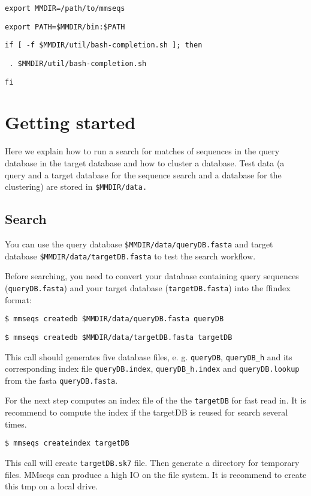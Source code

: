 \documentclass[11pt,a4paper]{report}
\begin{document}
\texttt{export MMDIR=/path/to/mmseqs}

\texttt{export PATH=\$MMDIR/bin:\$PATH}

\texttt{if [ -f \$MMDIR/util/bash-completion.sh ]; then}

\texttt{	. \$MMDIR/util/bash-completion.sh}

\texttt{fi}

\section{Getting started}

Here we explain how to run a search for matches of sequences in the
query database in the target database and how to cluster a database.
Test data (a query and a target database for the sequence search and
a database for the clustering) are stored in \texttt{\$MMDIR/data.}


\subsection*{Search}

You can use the query database \texttt{\$MMDIR/data/queryDB.fasta} and target database
\texttt{\$MMDIR/data/targetDB.fasta} to test the search workflow.

Before searching, you need to convert your database containing query
sequences (\texttt{queryDB.fasta}) and your target database (\texttt{targetDB.fasta})
into the ffindex format:

\texttt{\$ mmseqs createdb \$MMDIR/data/queryDB.fasta queryDB}

\texttt{\$ mmseqs createdb \$MMDIR/data/targetDB.fasta targetDB}
 
This call should generates five database files, e. g. \texttt{queryDB}, \texttt{queryDB\_h}
and its corresponding index file \texttt{queryDB.index}, \texttt{queryDB\_h.index} and \texttt{queryDB.lookup}  from the fasta \texttt{queryDB.fasta}.

For the next step computes an index file of the the \texttt{targetDB} for fast read in. It is recommend to compute the index if the targetDB is reused for search several times.

\texttt{\$ mmseqs createindex targetDB}

This call will create \texttt{targetDB.sk7} file. 
Then generate a directory for temporary files. MMseqs can produce a high IO on the file system. It is recommend to create this tmp on a local drive. 
\end{document}
